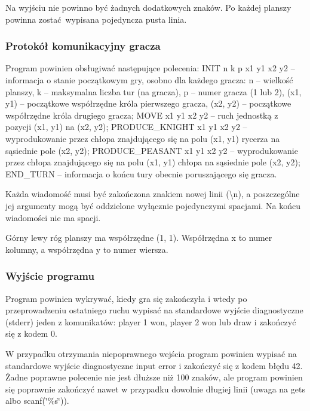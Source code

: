 Na wyjściu nie powinno być żadnych dodatkowych znaków. Po każdej planszy powinna zostać wypisana pojedyncza pusta linia.

\subsubsection*{Protokół komunikacyjny gracza}

Program powinien obsługiwać następujące polecenia\-: {\ttfamily I\-N\-I\-T n k p x1 y1 x2 y2} – informacja o stanie początkowym gry, osobno dla każdego gracza\-: n – wielkość planszy, k – maksymalna liczba tur (na gracza), p – numer gracza (1 lub 2), (x1, y1) – początkowe współrzędne króla pierwszego gracza, (x2, y2) – początkowe współrzędne króla drugiego gracza; {\ttfamily M\-O\-V\-E x1 y1 x2 y2} – ruch jednostką z pozycji (x1, y1) na (x2, y2); {\ttfamily P\-R\-O\-D\-U\-C\-E\-\_\-\-K\-N\-I\-G\-H\-T x1 y1 x2 y2} – wyprodukowanie przez chłopa znajdującego się na polu (x1, y1) rycerza na sąsiednie pole (x2, y2); {\ttfamily P\-R\-O\-D\-U\-C\-E\-\_\-\-P\-E\-A\-S\-A\-N\-T x1 y1 x2 y2} – wyprodukowanie przez chłopa znajdującego się na polu (x1, y1) chłopa na sąsiednie pole (x2, y2); {\ttfamily E\-N\-D\-\_\-\-T\-U\-R\-N} – informacja o końcu tury obecnie poruszającego się gracza.

Każda wiadomość musi być zakończona znakiem nowej linii ({\ttfamily \textbackslash{}n}), a poszczególne jej argumenty mogą być oddzielone wyłącznie pojedynczymi spacjami. Na końcu wiadomości nie ma spacji.

Górny lewy róg planszy ma współrzędne (1, 1). Współrzędna {\ttfamily x} to numer kolumny, a współrzędna {\ttfamily y} to numer wiersza.

\subsubsection*{Wyjście programu}

Program powinien wykrywać, kiedy gra się zakończyła i wtedy po przeprowadzeniu ostatniego ruchu wypisać na standardowe wyjście diagnostyczne ({\ttfamily stderr}) jeden z komunikatów\-: {\ttfamily player 1 won}, {\ttfamily player 2 won} lub {\ttfamily draw} i zakończyć się z kodem 0.

W przypadku otrzymania niepoprawnego wejścia program powinien wypisać na standardowe wyjście diagnostyczne {\ttfamily input error} i zakończyć się z kodem błędu 42. Żadne poprawne polecenie nie jest dłuższe niż 100 znaków, ale program powinien się poprawnie zakończyć nawet w przypadku dowolnie długiej linii (uwaga na {\ttfamily gets} albo {\ttfamily scanf(\char`\"{}\%s\char`\"{})}).

